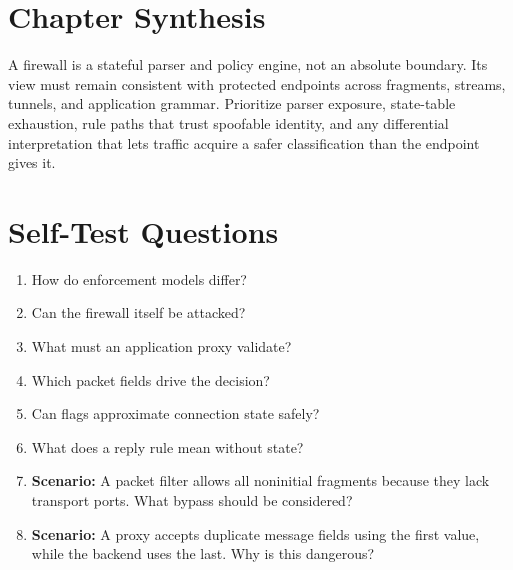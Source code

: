 \documentclass[11pt,letterpaper]{article}
\begin{document}
\section{Chapter Synthesis}
A firewall is a stateful parser and policy engine, not an absolute boundary. Its view must remain consistent with protected endpoints across fragments, streams, tunnels, and application grammar. Prioritize parser exposure, state-table exhaustion, rule paths that trust spoofable identity, and any differential interpretation that lets traffic acquire a safer classification than the endpoint gives it.
\section{Self-Test Questions}
\begin{enumerate}
\item How do enforcement models differ?
\item Can the firewall itself be attacked?
\item What must an application proxy validate?
\item Which packet fields drive the decision?
\item Can flags approximate connection state safely?
\item What does a reply rule mean without state?
\item \textbf{Scenario:} A packet filter allows all noninitial fragments because they lack transport ports. What bypass should be considered?
\item \textbf{Scenario:} A proxy accepts duplicate message fields using the first value, while the backend uses the last. Why is this dangerous?
\end{enumerate}
\clearpage
\end{document}
